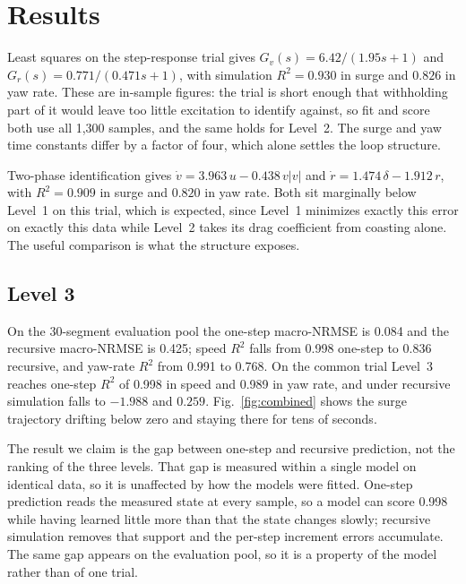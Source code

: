 \documentclass[conference]{IEEEtran}
\begin{document}
\section{Results}
\label{sec:results}

Least squares on the step-response trial gives $G_v(s)=6.42/(1.95s+1)$ and $G_r(s)=0.771/(0.471s+1)$, with simulation $R^2=0.930$ in surge and $0.826$ in yaw rate. These are in-sample figures: the trial is short enough that withholding part of it would leave too little excitation to identify against, so fit and score both use all 1{,}300 samples, and the same holds for Level~2. The surge and yaw time constants differ by a factor of four, which alone settles the loop structure.

Two-phase identification gives $\dot v = 3.963\,u - 0.438\,v|v|$ and $\dot r = 1.474\,\delta - 1.912\,r$, with $R^2=0.909$ in surge and $0.820$ in yaw rate. Both sit marginally below Level~1 on this trial, which is expected, since Level~1 minimizes exactly this error on exactly this data while Level~2 takes its drag coefficient from coasting alone. The useful comparison is what the structure exposes.

\subsection{Level 3}
\label{sec:l3-results}

On the 30-segment evaluation pool the one-step macro-NRMSE is 0.084 and the recursive macro-NRMSE is 0.425; speed $R^2$ falls from 0.998 one-step to 0.836 recursive, and yaw-rate $R^2$ from 0.991 to 0.768. On the common trial Level~3 reaches one-step $R^2$ of 0.998 in speed and 0.989 in yaw rate, and under recursive simulation falls to $-1.988$ and $0.259$. Fig.~\ref{fig:combined} shows the surge trajectory drifting below zero and staying there for tens of seconds.

The result we claim is the gap between one-step and recursive prediction, not the ranking of the three levels. That gap is measured within a single model on identical data, so it is unaffected by how the models were fitted. One-step prediction reads the measured state at every sample, so a model can score 0.998 while having learned little more than that the state changes slowly; recursive simulation removes that support and the per-step increment errors accumulate. The same gap appears on the evaluation pool, so it is a property of the model rather than of one trial.
\end{document}
